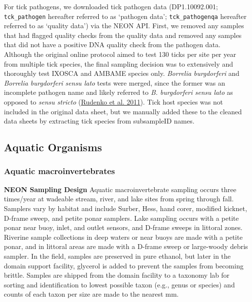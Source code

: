 \documentclass[
  12pt,
]{article}
\begin{document}
For tick pathogens, we downloaded tick pathogen data (DP1.10092.001; \texttt{tck\_pathogen} hereafter referred to as `pathogen data'; \texttt{tck\_pathogenqa} hereafter referred to as `quality data') via the NEON API. First, we removed any samples that had flagged quality checks from the quality data and removed any samples that did not have a positive DNA quality check from the pathogen data. Although the original online protocol aimed to test 130 ticks per site per year from multiple tick species, the final sampling decision was to extensively and thoroughly test IXOSCA and AMBAME species only. \emph{Borrelia burgdorferi} and \emph{Borrelia burgdorferi sensu lato} tests were merged, since the former was an incomplete pathogen name and likely referred to \emph{B. burgdorferi sensu lato} as opposed to \emph{sensu stricto} (\protect\hyperlink{ref-rudenko2011updates}{Rudenko et al. 2011}). Tick host species was not included in the original data sheet, but we manually added these to the cleaned data sheets by extracting tick species from subsampleID names.

\hypertarget{aquatic-organisms}{%
\subsection{Aquatic Organisms}\label{aquatic-organisms}}

\hypertarget{aquatic-macroinvertebrates}{%
\subsubsection{Aquatic macroinvertebrates}\label{aquatic-macroinvertebrates}}

\textbf{NEON Sampling Design} Aquatic macroinvertebrate sampling occurs three times/year at wadeable stream, river, and lake sites from spring through fall. Samplers vary by habitat and include Surber, Hess, hand corer, modified kicknet, D-frame sweep, and petite ponar samplers. Lake sampling occurs with a petite ponar near buoy, inlet, and outlet sensors, and D-frame sweeps in littoral zones. Riverine sample collections in deep waters or near buoys are made with a petite ponar, and in littoral areas are made with a D-frame sweep or large-woody debris sampler. In the field, samples are preserved in pure ethanol, but later in the domain support facility, glycerol is added to prevent the samples from becoming brittle. Samples are shipped from the domain facility to a taxonomy lab for sorting and identification to lowest possible taxon (e.g., genus or species) and counts of each taxon per size are made to the nearest mm.
\end{document}
